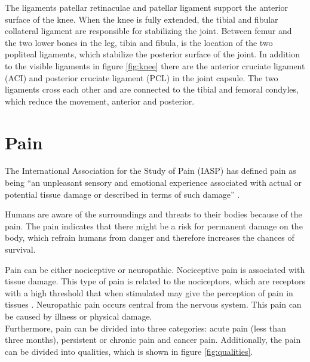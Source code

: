 \noindent
The ligaments patellar retinaculae and patellar ligament support the anterior surface of the knee. When the knee is fully extended, the tibial and fibular collateral ligament are responsible for stabilizing the joint. Between femur and the two lower bones in the leg, tibia and fibula, is the location of the two popliteal ligaments, which stabilize the posterior surface of the joint. In addition to the visible ligaments in figure \ref{fig:knee} there are the anterior cruciate ligament (ACI) and posterior cruciate ligament (PCL) in the joint capsule. The two ligaments cross each other and are connected to the tibial and femoral condyles, which reduce the movement, anterior and posterior.\citep{Martini2012}\newline
\noindent


\section{Pain}
The International Association for the Study of Pain (IASP) has defined pain as being “an unpleasant sensory and emotional experience associated with actual or potential tissue damage or described in terms of such damage” \citep{IASP2012, Schmidt1989}.

\noindent
Humans are aware of the surroundings and threats to their bodies because of the pain. The pain indicates that there might be a risk for permanent damage on the body, which refrain humans from danger and therefore increases the chances of survival. 


\noindent
Pain can be either nociceptive or neuropathic. Nociceptive pain is associated with tissue damage. This type of pain is related to the nociceptors, which are receptors with a high threshold that when stimulated may give the perception of pain in tissues \citep{Schmidt2013}. Neuropathic pain occurs central from the nervous system. This pain can be caused by illness or physical damage.\citep{Schmidt2013} \\


\noindent
Furthermore, pain can be divided into three categories: acute pain (less than three months), persistent or chronic pain and cancer pain.\citep{Briggs2010} Additionally, the pain can be divided into qualities, which is shown in figure \ref{fig:qualities}. 

